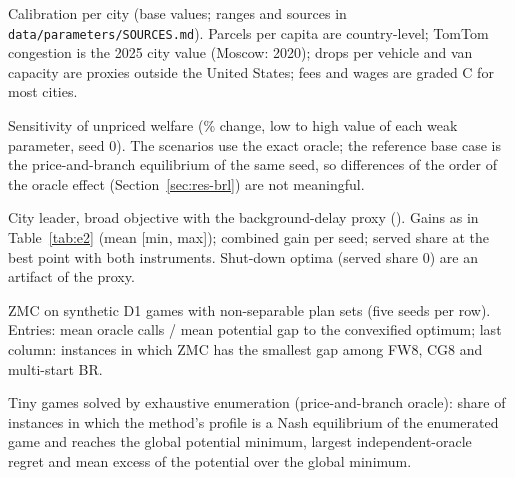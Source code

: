 \documentclass[preprint,11pt]{elsarticle}
\theoremstyle{definition}
\theoremstyle{remark}
\begin{document}
\begin{table}[h]\centering\small
\caption{Calibration per city (base values; ranges and sources in \texttt{data/parameters/SOURCES.md}). Parcels per capita are country-level; TomTom congestion is the 2025 city value (Moscow: 2020); drops per vehicle and van capacity are proxies outside the United States; fees and wages are graded C for most cities.}\label{tab:params}
\end{table}

\begin{table}[h]\centering\small
\caption{Sensitivity of unpriced welfare (\% change, low to high value of each weak parameter, seed 0). The scenarios use the exact oracle; the reference base case is the price-and-branch equilibrium of the same seed, so differences of the order of the oracle effect (Section~\ref{sec:res-brl}) are not meaningful.}\label{tab:sens}
\end{table}

\begin{table}[h]\centering\small
\caption{City leader, broad objective with the background-delay proxy (\EtwoSeeds). Gains as in Table~\ref{tab:e2} (mean [min, max]); combined gain per seed; served share at the best point with both instruments. Shut-down optima (served share 0) are an artifact of the proxy.}\label{tab:e2broad}
\end{table}



\begin{table}[h]\centering\small
\caption{ZMC on synthetic D1 games with non-separable plan sets (five seeds per row). Entries: mean oracle calls / mean potential gap to the convexified optimum; last column: instances in which ZMC has the smallest gap among FW8, CG8 and multi-start BR.}\label{tab:zmc-synth}
\end{table}

\begin{table}[h]\centering\small
\caption{Tiny games solved by exhaustive enumeration (price-and-branch oracle): share of instances in which the method's profile is a Nash equilibrium of the enumerated game and reaches the global potential minimum, largest independent-oracle regret and mean excess of the potential over the global minimum.}\label{tab:tiny}
\end{table}
\end{document}
